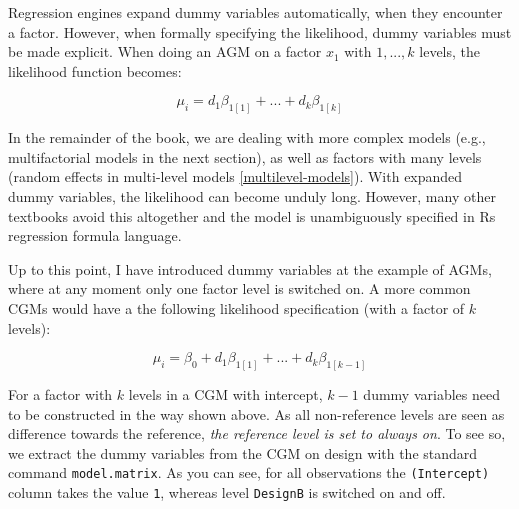 \documentclass[]{svmono}
\newenvironment{Shaded}{\begin{snugshade}}{\end{snugshade}}
\newcommand{\KeywordTok}[1]{\textcolor[rgb]{0.13,0.29,0.53}{\textbf{#1}}}
\newcommand{\DecValTok}[1]{\textcolor[rgb]{0.00,0.00,0.81}{#1}}
\newcommand{\StringTok}[1]{\textcolor[rgb]{0.31,0.60,0.02}{#1}}
\newcommand{\OperatorTok}[1]{\textcolor[rgb]{0.81,0.36,0.00}{\textbf{#1}}}
\newcommand{\NormalTok}[1]{#1}
\theoremstyle{definition}
\theoremstyle{definition}
\theoremstyle{definition}
\theoremstyle{remark}
\begin{document}
Regression engines expand dummy variables automatically, when they
encounter a factor. However, when formally specifying the likelihood,
dummy variables must be made explicit. When doing an AGM on a factor
\(x_1\) with \(1,...,k\) levels, the likelihood function becomes:

\[\mu_i=d_1 \beta_{1[1]}+...+d_k \beta_{1[k]}\]

In the remainder of the book, we are dealing with more complex models
(e.g., multifactorial models in the next section), as well as factors
with many levels (random effects in multi-level models
\ref{multilevel-models}). With expanded dummy variables, the likelihood
can become unduly long. However, many other textbooks avoid this
altogether and the model is unambiguously specified in Rs regression
formula language.

Up to this point, I have introduced dummy variables at the example of
AGMs, where at any moment only one factor level is switched on. A more
common CGMs would have a the following likelihood specification (with a
factor of \(k\) levels):

\[\mu_i = \beta_0 + d_1 \beta_{1[1]}+...+d_k \beta_{1[k-1]}\]

For a factor with \(k\) levels in a CGM with intercept, \(k-1\) dummy
variables need to be constructed in the way shown above. As all
non-reference levels are seen as difference towards the reference,
\emph{the reference level is set to always on}. To see so, we extract
the dummy variables from the CGM on design with the standard command
\texttt{model.matrix}. As you can see, for all observations the
\texttt{(Intercept)} column takes the value \texttt{1}, whereas level
\texttt{DesignB} is switched on and off.

\begin{Shaded}
\end{Shaded}
\end{document}
